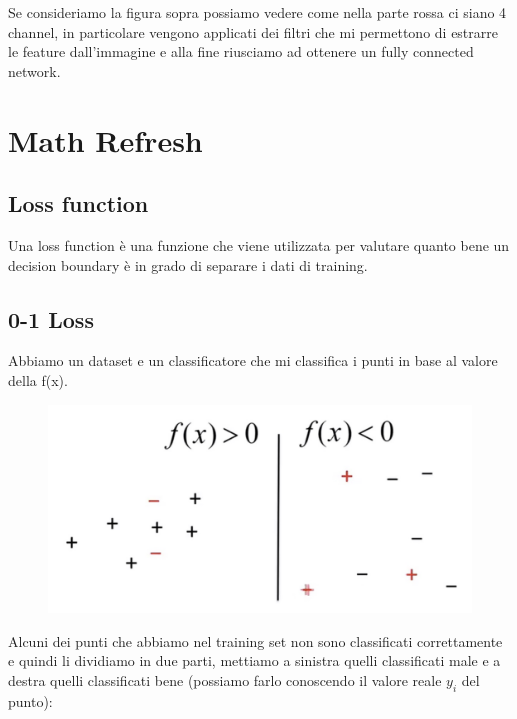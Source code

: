 \documentclass[14pt]{extreport}
\begin{document}
Se consideriamo la figura sopra possiamo vedere come nella parte rossa ci siano 4 channel, in particolare vengono applicati dei filtri che mi
permettono di estrarre le feature dall'immagine e alla fine riusciamo ad ottenere un fully connected network.






































\chapter{Math Refresh}

\section{Loss function}

Una loss function è una funzione che viene utilizzata per valutare quanto bene un decision boundary è in grado di separare i dati di training.

\section{0-1 Loss}

Abbiamo un dataset e un classificatore che mi classifica i punti in base al valore della f(x).
\begin{figure}[H]
\centering
\includegraphics[width=0.5\linewidth]{330.jpeg}
\end{figure}

Alcuni dei punti che abbiamo nel training set non sono classificati correttamente e quindi li dividiamo in due parti, mettiamo a sinistra quelli
classificati male e a destra quelli classificati bene (possiamo farlo conoscendo il valore reale $y_i$ del punto):
\end{document}
